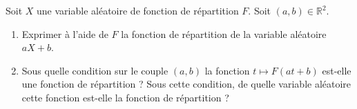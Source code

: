 \medskip

\begin{mdframed}
\begin{exercice}
Soit $X$ une variable aléatoire de fonction de répartition $F$. Soit $(a, b) \in \mathbb{R}^2$. 

\begin{enumerate}
\item Exprimer à l'aide de $F$ la fonction de répartition de la variable aléatoire $aX + b$. 
\item Sous quelle condition sur le couple $(a, b)$ la fonction $t \mapsto F(at + b)$ est-elle une fonction de répartition ? Sous cette condition, de quelle variable aléatoire cette fonction est-elle la fonction de répartition ?
\end{enumerate}
\end{exercice}
\end{mdframed}

